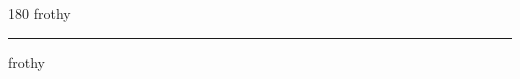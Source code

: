 
\begin{frame}
\begin{center}
\begin{turn}{180}
{\fontsize{2.5cm}{1em}\selectfont frothy}
\end{turn}
\vspace{1em}\par  
\hrule
\vspace{1em}\par  
{\fontsize{2.5cm}{1em}\selectfont frothy}
\end{center}
\end{frame}
